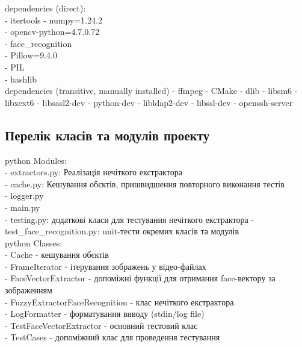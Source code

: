 \documentclass[11pt]{article}
\begin{document}
dependencies (direct): \\
- itertools - numpy=1.24.2 \\
- opencv-python=4.7.0.72 \\
- face\_recognition \\
- Pillow=9.4.0 \\
- PIL \\
- hashlib\\

dependencies (transitive, manually installed) - ffmpeg - CMake - dlib -
libsm6 - libxext6 - libsasl2-dev - python-dev - libldap2-dev -
libssl-dev - openssh-server

\hypertarget{ux43fux435ux440ux435ux43bux456ux43a-ux43aux43bux430ux441ux456ux432-ux442ux430-ux43cux43eux434ux443ux43bux456ux432-ux43fux440ux43eux435ux43aux442ux443}{%
\subsection{Перелік класів та модулів
проекту}\label{ux43fux435ux440ux435ux43bux456ux43a-ux43aux43bux430ux441ux456ux432-ux442ux430-ux43cux43eux434ux443ux43bux456ux432-ux43fux440ux43eux435ux43aux442ux443}}

python Modules: \\
- extractors.py: Реалізація нечіткого екстрактора \\
- cache.py: Кешування обєктів, пришвидшення повторного виконання тестів \\
- logger.py \\
- main.py\\
- testing.py: додаткові класи для тестування
нечіткого екстрактора - test\_face\_recognition.py: unit-тести окремих
класів та модулів\\

python Classes: \\
- Cache - кешування обєктів \\
- FrameIterator - ітерування
зображень у відео-файлах \\
- FaceVectorExtractor - допоміжні функції для
отримання face-вектору за зображенням \\
- FuzzyExtractorFaceRecognition -
клас нечіткого екстрактора.\\
- LogFormatter - форматування виводу (stdin/log file) \\
- TestFaceVectorExtractor - основний тестовий клас \\
- TestCases - допоміжний клас для проведення тестування

\vspace{20ex}
\end{document}
